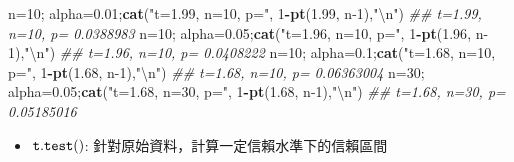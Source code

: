 \documentclass[hyperref,]{ctexart}
\newenvironment{Shaded}{\begin{snugshade}}{\end{snugshade}}
\newcommand{\CharTok}[1]{\textcolor[rgb]{0.31,0.60,0.02}{#1}}
\newcommand{\CommentTok}[1]{\textcolor[rgb]{0.56,0.35,0.01}{\textit{#1}}}
\newcommand{\DecValTok}[1]{\textcolor[rgb]{0.00,0.00,0.81}{#1}}
\newcommand{\FloatTok}[1]{\textcolor[rgb]{0.00,0.00,0.81}{#1}}
\newcommand{\KeywordTok}[1]{\textcolor[rgb]{0.13,0.29,0.53}{\textbf{#1}}}
\newcommand{\NormalTok}[1]{#1}
\newcommand{\OperatorTok}[1]{\textcolor[rgb]{0.81,0.36,0.00}{\textbf{#1}}}
\newcommand{\StringTok}[1]{\textcolor[rgb]{0.31,0.60,0.02}{#1}}
\providecommand{\tightlist}{%
  \setlength{\itemsep}{0pt}\setlength{\parskip}{0pt}}
\begin{document}
\begin{Shaded}
\begin{Highlighting}[]
\NormalTok{n=}\DecValTok{10}\NormalTok{; alpha=}\FloatTok{0.01}\NormalTok{;}\KeywordTok{cat}\NormalTok{(}\StringTok{"t=1.99, n=10, p="}\NormalTok{, }\DecValTok{1}\OperatorTok{-}\KeywordTok{pt}\NormalTok{(}\FloatTok{1.99}\NormalTok{, n}\DecValTok{-1}\NormalTok{),}\StringTok{"}\CharTok{\textbackslash{}n}\StringTok{"}\NormalTok{)}
\CommentTok{## t=1.99, n=10, p= 0.0388983}
\NormalTok{n=}\DecValTok{10}\NormalTok{; alpha=}\FloatTok{0.05}\NormalTok{;}\KeywordTok{cat}\NormalTok{(}\StringTok{"t=1.96, n=10, p="}\NormalTok{, }\DecValTok{1}\OperatorTok{-}\KeywordTok{pt}\NormalTok{(}\FloatTok{1.96}\NormalTok{, n}\DecValTok{-1}\NormalTok{),}\StringTok{"}\CharTok{\textbackslash{}n}\StringTok{"}\NormalTok{)}
\CommentTok{## t=1.96, n=10, p= 0.0408222}
\NormalTok{n=}\DecValTok{10}\NormalTok{; alpha=}\FloatTok{0.1}\NormalTok{;}\KeywordTok{cat}\NormalTok{(}\StringTok{"t=1.68, n=10, p="}\NormalTok{, }\DecValTok{1}\OperatorTok{-}\KeywordTok{pt}\NormalTok{(}\FloatTok{1.68}\NormalTok{, n}\DecValTok{-1}\NormalTok{),}\StringTok{"}\CharTok{\textbackslash{}n}\StringTok{"}\NormalTok{)}
\CommentTok{## t=1.68, n=10, p= 0.06363004}
\NormalTok{n=}\DecValTok{30}\NormalTok{; alpha=}\FloatTok{0.05}\NormalTok{;}\KeywordTok{cat}\NormalTok{(}\StringTok{"t=1.68, n=30, p="}\NormalTok{, }\DecValTok{1}\OperatorTok{-}\KeywordTok{pt}\NormalTok{(}\FloatTok{1.68}\NormalTok{, n}\DecValTok{-1}\NormalTok{),}\StringTok{"}\CharTok{\textbackslash{}n}\StringTok{"}\NormalTok{)}
\CommentTok{## t=1.68, n=30, p= 0.05185016}
\end{Highlighting}
\end{Shaded}

\begin{itemize}
\tightlist
\item
  \(\tt{t.test()}\): 針對原始資料，計算一定信賴水準下的信賴區間
\end{itemize}
\end{document}
